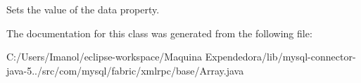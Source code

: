Sets the value of the data property. 

The documentation for this class was generated from the following file\+:\begin{DoxyCompactItemize}
\item 
C\+:/\+Users/\+Imanol/eclipse-\/workspace/\+Maquina Expendedora/lib/mysql-\/connector-\/java-\/5../src/com/mysql/fabric/xmlrpc/base/Array.\+java\end{DoxyCompactItemize}
